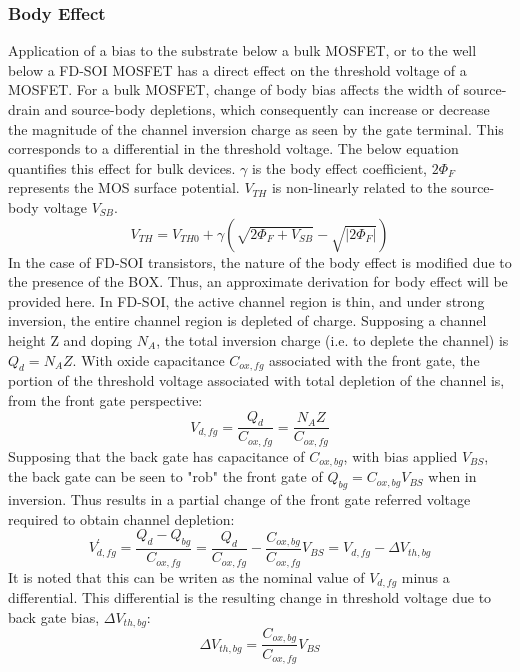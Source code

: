 	\subsubsection{Body Effect}
	Application of a bias to the substrate below a bulk MOSFET, or to the well below a FD-SOI MOSFET has a direct effect on the threshold voltage of a MOSFET. For a bulk MOSFET, change of body bias affects the width of source-drain and source-body depletions, which consequently can increase or decrease the magnitude of the channel inversion charge as seen by the gate terminal. This corresponds to a differential in the threshold voltage. The below equation \cite{razavi_2017} quantifies this effect for bulk devices. $\gamma$ is the body effect coefficient, $2\Phi_F$ represents the MOS surface potential. $V_{TH}$ is non-linearly related to the source-body voltage $V_{SB}$.
	\begin{equation}
		V_{TH} = V_{TH0} + \gamma\left( \sqrt{2\Phi_F + V_{SB}} - \sqrt{|2\Phi_F|} \right)
	\end{equation}
	In the case of FD-SOI transistors, the nature of the body effect is modified due to the presence of the BOX. Thus, an approximate derivation for body effect will be provided here. In FD-SOI, the active channel region is thin, and under strong inversion, the entire channel region is depleted of charge. Supposing a channel height Z and doping $N_A$, the total inversion charge (i.e. to deplete the channel) is $Q_{d} = N_AZ$. With oxide capacitance $C_{ox,fg}$ associated with the front gate, the portion of the threshold voltage associated with total depletion of the channel is, from the front gate perspective:
	\begin{equation}
		V_{d,fg} = \frac{Q_d}{C_{ox,fg}} = \frac{N_AZ}{C_{ox,fg}} 
	\end{equation}
	Supposing that the back gate has capacitance of $C_{ox,bg}$, with bias applied $V_{BS}$, the back gate can be seen to "rob" the front gate of $Q_{bg} = C_{ox,bg}V_{BS}$ when in inversion. Thus results in a partial change of the front gate referred voltage required to obtain channel depletion:
	\begin{equation}
		V_{d,fg}^{'} = \frac{Q_d-Q_{bg}}{C_{ox,fg}} = \frac{Q_d}{C_{ox,fg}} - \frac{C_{ox,bg}}{C_{ox,fg}}V_{BS} = V_{d,fg}-\Delta V_{th,bg}
	\end{equation}
	It is noted that this can be writen as the nominal value of $V_{d,fg}$ minus a differential. This differential is the resulting change in threshold voltage due to back gate bias, $\Delta V_{th,bg}$:
	\begin{equation}
		\Delta V_{th,bg}= \frac{C_{ox,bg}}{C_{ox,fg}}V_{BS} 
	\end{equation}	

